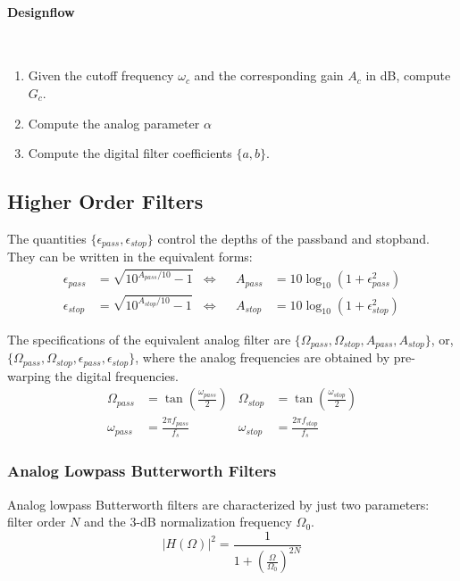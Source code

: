 \paragraph{Designflow} ~\\
\begin{enumerate}
	\item Given the cutoff frequency $\omega_c$ and the corresponding gain $A_c$ in dB, compute $G_c$.
	\item Compute the analog parameter $\alpha$
	\item Compute the digital filter coefficients $\{a,b\}$.
\end{enumerate}


\subsection{Higher Order Filters}
The quantities $\{\epsilon_{pass}, \epsilon_{stop}\}$ control the depths of the passband and stopband.
They can be written in the equivalent forms:
\begin{align*}
	\epsilon_{pass} &= \sqrt{10^{A_{pass}/10} - 1} & \Longleftrightarrow &&
	A_{pass}&= 10\log_{10}(1 + \epsilon_{pass}^2) \\
	\epsilon_{stop} &= \sqrt{10^{A_{stop}/10} - 1} & \Longleftrightarrow &&
	A_{stop}&= 10\log_{10}(1 + \epsilon_{stop}^2)
\end{align*}

The specifications of the equivalent analog filter are $\{\Omega_{pass}, \Omega_{stop}, A_{pass}, A_{stop} \}$, or, $\{\Omega_{pass}, \Omega_{stop}, \epsilon_{pass}, \epsilon_{stop} \}$, where the analog frequencies are obtained by pre-warping the digital frequencies.
\begin{align*}
	\Omega_{pass} &= \tan\left(\frac{\omega_{pass}}{2}\right) &
	\Omega_{stop} &= \tan\left(\frac{\omega_{stop}}{2}\right) \\
	\omega_{pass} &= \frac{2\pi f_{pass}}{f_s} &
	\omega_{stop} &= \frac{2\pi f_{stop}}{f_s}
\end{align*}

\subsubsection{Analog Lowpass Butterworth Filters}
Analog lowpass Butterworth filters are characterized by just two parameters:
filter order $N$ and the 3-dB normalization frequency $\Omega_0$.
\[
	\left|H(\Omega)\right|^2 =
		\frac{1}{1 + \left(\frac{\Omega}{\Omega_0}\right)^{2N}}
\]

